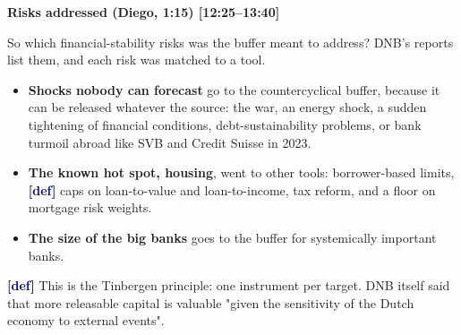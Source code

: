 {\small\textbf{Risks addressed (Diego, 1:15) [12:25–13:40]}}\par\smallskip
So which financial-stability risks was the buffer meant to address? DNB's reports list them, and each risk was matched to a tool.
\begin{itemize}\setlength\itemsep{0pt}
\item \textbf{Shocks nobody can forecast} go to the countercyclical buffer, because it can be released whatever the source: the war, an energy shock, a sudden tightening of financial conditions, debt-sustainability problems, or bank turmoil abroad like SVB and Credit Suisse in 2023.
\item \textbf{The known hot spot, housing}, went to other tools: borrower-based limits, \textcolor{navy}{\textbf{[def]}} caps on loan-to-value and loan-to-income, tax reform, and a floor on mortgage risk weights.
\item \textbf{The size of the big banks} goes to the buffer for systemically important banks.
\end{itemize}
\par\smallskip
\textcolor{navy}{\textbf{[def]}} This is the Tinbergen principle: one instrument per target. DNB itself said that more releasable capital is valuable "given the sensitivity of the Dutch economy to external events".
